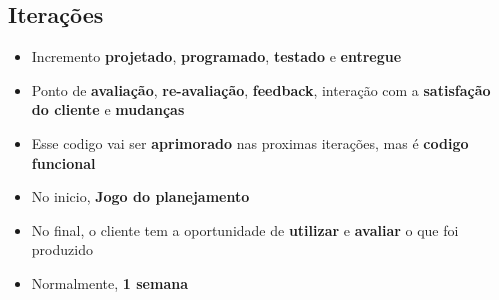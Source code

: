 \documentclass[10pt]{beamer}
\begin{document}
\subsection{Iterações}

\begin{frame}
  \begin{itemize}%
    \item Incremento \textbf{projetado}, \textbf{programado}, \textbf{testado} e \textbf{entregue}
    \item Ponto de \textbf{avaliação}, \textbf{re-avaliação}, \textbf{feedback}, interação com a \textbf{satisfação do cliente} e \textbf{mudanças}
    \item Esse codigo vai ser \textbf{aprimorado} nas proximas iterações, mas é \textbf{codigo funcional}
    \item No inicio, \textbf{Jogo do planejamento}
    \item No final, o cliente tem a oportunidade de \textbf{utilizar} e \textbf{avaliar} o que foi produzido
    \item Normalmente, \textbf{1 semana}
  \end{itemize}
\end{frame}

\begin{frame}
  \begin{figure}
    \centering
  \end{figure}
\end{frame}
\end{document}
